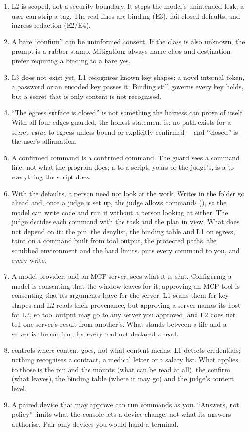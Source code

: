 \begin{enumerate}[leftmargin=2em]
\item L2 is scoped, not a security boundary. It stops the model's
  unintended leak; a user can strip a tag. The real lines are binding
  (E3), fail-closed defaults, and ingress redaction (E2/E4).
\item A bare ``confirm'' can be uninformed consent. If the class is also
  unknown, the prompt is a rubber stamp. Mitigation: always name class and
  destination; prefer requiring a binding to a bare yes.
\item L3 does not exist yet. L1 recognises known key shapes; a novel
  internal token, a password or an encoded key passes it. Binding still
  governs every key \nodwyn{} holds, but a secret that is only content is
  not recognised.
\item ``The egress surface is closed'' is not something the harness can
  prove of itself. With all four edges guarded, the honest statement is: no
  path exists for a secret \emph{value} to egress unless bound or explicitly
  confirmed\,---\,and ``closed'' is the user's affirmation.
\item A confirmed command is a confirmed command. The guard sees a command
  line, not what the program does; a  to a script, yours or the
  judge's, is a  to everything the script does.
\item With the defaults, a person need not look at the work. Writes in
  the folder go ahead and, once a judge is set up, the judge allows
  commands (), so the model can write code and run it without a
  person looking at either. The judge decides each command with the task
  and the plan in view. What does not depend on it: the pin, the
  denylist, the binding table and L1 on egress, taint on a command built
  from tool output, the protected paths, the scrubbed environment and the
  hard limits.  puts every command to you,
  and  every write.
\item A model provider, and an MCP server, sees what it is sent.
  Configuring a model is consenting that the window leaves for it;
  approving an MCP tool is consenting that its arguments leave for the
  server. L1 scans them for key shapes and L2 reads their provenance, but
  approving a server names its host for L2, so tool output may go to any
  server you approved, and L2 does not tell one server's result from
  another's. What stands between a file and a server is the confirm, for
  every tool not declared a read.
\item \nodwyn{} controls where content goes, not what content means. L1
  detects credentials; nothing recognises a contract, a medical letter or a
  salary list. What applies to those is the pin and the mounts (what can be
  read at all), the confirm (what leaves), the binding table (where it may
  go) and the judge's content level.
\item A paired device that may approve  can run commands as
  you. ``Answers, not policy'' limits what the console lets a device change,
  not what its answers authorise. Pair only devices you would hand a
  terminal.
\end{enumerate}

